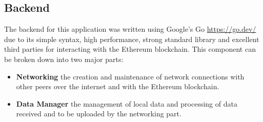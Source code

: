 \subsection{Backend}

The backend for this application was written using Google's Go \url{https://go.dev/} due to its simple syntax, high performance, strong standard library and excellent third parties for interacting with the Ethereum blockchain. This component can be broken down into two major parts:

\begin{itemize}
  \item \textbf{Networking} the creation and maintenance of network connections with other peers over the internet and with the Ethereum blockchain.
  \item \textbf{Data Manager} the management of local data and processing of data received and to be uploaded by the networking part.
\end{itemize}



